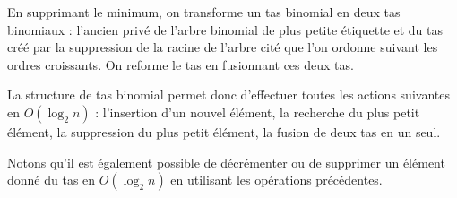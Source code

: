 En supprimant le minimum, on transforme un tas binomial en deux tas binomiaux : l'ancien privé de l'arbre binomial de plus petite étiquette et du tas créé par la suppression de la racine de l'arbre cité que l'on ordonne suivant les ordres croissants. On reforme le tas en fusionnant ces deux tas.
\medskip

La structure de tas binomial permet donc d'effectuer toutes les actions suivantes en $O(\log_2n)$ : l'insertion d'un nouvel élément, la recherche du plus petit élément, la suppression du plus petit élément, la fusion de deux tas en un seul.
\medskip

Notons qu'il est également possible de décrémenter ou de supprimer un élément donné du tas en $O(\log_2n)$ en utilisant les opérations précédentes.
\bigskip

\Fin

